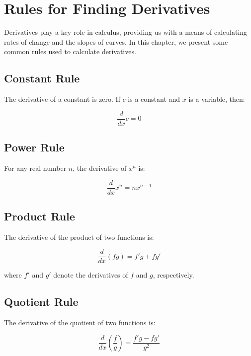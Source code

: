 \chapter{Rules for Finding Derivatives}


Derivatives play a key role in calculus, providing us with a means of
calculating rates of change and the slopes of curves. In this chapter, we present
some common rules used to calculate derivatives.

\section{Constant Rule}

The derivative of a constant is zero. If $c$ is a constant and $x$ is
a variable, then:

\begin{equation}
\frac{d}{dx}c = 0
\end{equation}

\section{Power Rule}

For any real number $n$, the derivative of $x^n$ is:

\begin{equation}
\frac{d}{dx}x^n = nx^{n-1}
\end{equation}

\section{Product Rule}

The derivative of the product of two functions is:

\begin{equation}
\frac{d}{dx}(fg) = f'g + fg'
\end{equation}

where $f'$ and $g'$ denote the derivatives of $f$ and $g$,
respectively.

\section{Quotient Rule}

The derivative of the quotient of two functions is:

\begin{equation}
\frac{d}{dx}\left(\frac{f}{g}\right) = \frac{f'g - fg'}{g^2}
\end{equation}

